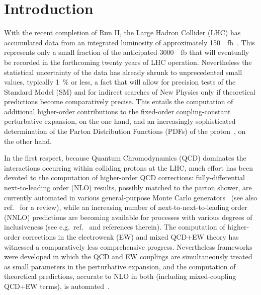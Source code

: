 \section{Introduction}
\label{sec:introduction}

With the recent completion of Run II, the Large Hadron Collider (LHC) has 
accumulated data from an integrated luminosity of approximately 
\SI{150}{\per\femto\barn}~\cite{Mangano:2020icy}. This represents only a small fraction of
the anticipated \SI{3000}{\per\femto\barn} that will eventually be recorded in the
forthcoming twenty years of LHC operation. Nevertheless the statistical 
uncertainty of the data has already shrunk to unprecedented small values,
typically \SI{1}{\percent} or less, a fact that will allow for precision tests of the
Standard Model (SM) and for indirect searches of New Physics only if 
theoretical predictions become comparatively precise. This entails the 
computation of additional higher-order contributions to the fixed-order 
coupling-constant perturbative expansion, on the one hand, and an increasingly 
sophisticated determination of the Parton Distribution Functions (PDFs) of the 
proton~\cite{Gao:2017yyd}, on the other hand. 

In the first respect, because Quantum Chromodynamics (QCD) dominates the 
interactions occurring within colliding protons at the LHC, much effort 
has been devoted to the computation of higher-order QCD corrections: 
fully-differential next-to-leading order (NLO) results, possibly matched to the
parton shower, are currently automated in various general-purpose
Monte Carlo generators~\cite{Gleisberg:2008ta,Alwall:2014hca,Bellm:2015jjp}
(see also ref.~\cite{Buckley:2011ms} for a review),
while an increasing number of next-to-next-to-leading order (NNLO) predictions 
are becoming available for processes with various degrees of inclusiveness
(see e.g.\ ref.~\cite{Amoroso:2020lgh} and references therein). The computation
of higher-order corrections in the electroweak (EW) and mixed QCD+EW theory has
witnessed a comparatively less comprehensive progress. Nevertheless frameworks 
were developed in which the QCD and EW couplings are simultaneously treated as 
small parameters in the perturbative expansion, and the computation of 
theoretical predictions, accurate to NLO in both (including mixed-coupling 
QCD+EW terms), is automated~\cite{Biedermann:2017yoi,Frederix:2018nkq}.

